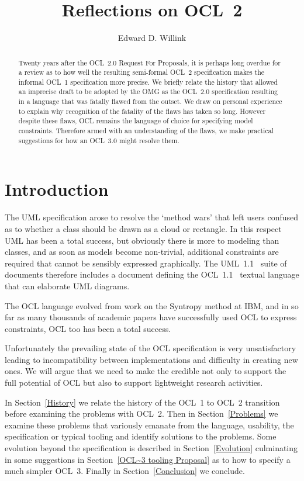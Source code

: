 \documentclass{jot}
\title{Reflections on OCL~2}
\author[affiliation=orgname, nowrap] %
{Edward D. Willink}
{is the chair of QVT and OCL specification Revision Task Forces at the Object Management Group and project leader for QVTd and OCL at the Eclipse Foundation.
	Contact him at \email{ed \_at\_ willink.me.uk}.}
\affiliation{orgname}{Willink Transformations Ltd., Reading, UK,}
\begin{document}
\begin{abstract}
	
Twenty years after the OCL~2.0 Request For Proposals, it is perhaps long overdue for a review as to how well the resulting semi-formal OCL~2 specification makes the informal OCL~1 specification more precise. We briefly relate the history that allowed an imprecise draft to be adopted by the OMG as the OCL~2.0 specification resulting in a language that was fatally flawed from the outset. We draw on personal experience to explain why recognition of the fatality of the flaws has taken so long. However despite these flaws, OCL remains the language of choice for specifying model constraints. Therefore armed with an understanding of the flaws, we make practical suggestions for how an OCL~3.0 might resolve them.

\end{abstract}


\section{Introduction}

The UML specification arose to resolve the `method wars' that left users confused as to whether a class should be drawn as a cloud or rectangle. In this respect UML has been a total success, but obviously there is more to modeling than classes, and as soon as models become non-trivial, additional constraints are required that cannot be sensibly expressed graphically. The UML~1.1~\cite{UML-1.1} suite of documents therefore includes a document defining the OCL~1.1~\cite{OCL-1.1} textual language that can elaborate UML diagrams.

The OCL language evolved from work on the Syntropy method at IBM, and in so far as many thousands of academic papers have successfully used OCL to express constraints, OCL too has been a total success.

Unfortunately the prevailing state of the OCL specification is very unsatisfactory leading to incompatibility between implementations and difficulty in creating new ones. We will argue that we need to make the credible not only to support the full potential of OCL but also to support lightweight research activities. 

In Section~\ref{History} we relate the history of the OCL~1 to OCL~2 transition before examining the problems with OCL~2. Then in Section~\ref{Problems} we examine these problems that variously emanate from the language, usability, the specification or typical tooling and identify solutions to the problems. Some evolution beyond the specification is described in Section~\ref{Evolution} culminating in some suggestions in Section~\ref{OCL~3 tooling Proposal} as to how to specify a much simpler OCL~3. Finally in Section~\ref{Conclusion} we conclude.
\end{document}
